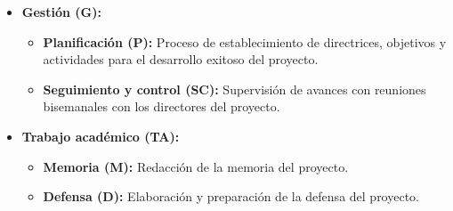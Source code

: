 \begin{itemize}
\begin{itemize}
\begin{itemize}
        \end{itemize}
    \end{itemize}
  \item\textbf{Gestión (G): }
    \begin{itemize}
      \item\textbf{Planificación (P): }Proceso de establecimiento de directrices, objetivos y actividades para el desarrollo exitoso del proyecto.
      \item\textbf{Seguimiento y control (SC): }Supervisión de avances con reuniones bisemanales con los directores del proyecto.
    \end{itemize}
  \item\textbf{Trabajo académico (TA): }
    \begin{itemize}
      \item\textbf{Memoria (M): }Redacción de la memoria del proyecto. 
      \item\textbf{Defensa (D): }Elaboración y preparación de la defensa del proyecto.
    \end{itemize}
\end{itemize}






